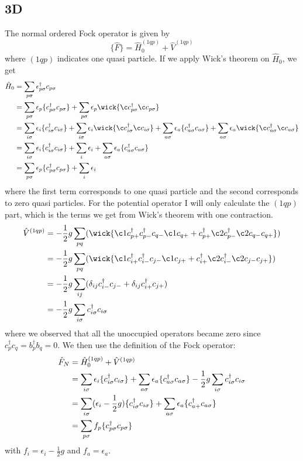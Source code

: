 \documentclass[norsk,a4paper,12pt]{article}
\begin{document}
\subsection*{3D}
The normal ordered Fock operator is given by 
\begin{equation}
\{\hat{F}\}=\hat{H}_0^{(1qp)}+\hat{V}^{(1qp)}
\end{equation}
where $(1qp)$ indicates one quasi particle. If we apply Wick's theorem on $\hat{H}_0$, we get
\begin{align}
\hat{H}_0&=\sum_{p\sigma}\epsilon_{p\sigma}^{\dagger}c_{p\sigma}\notag\\
&=\sum_{p\sigma}\epsilon_{p}\{c_{p\sigma}^{\dagger}c_{p\sigma}\}+\sum_{p\sigma}\epsilon_p\wick{\c c_{p\sigma}^{\dagger}\c c_{p\sigma}}\notag\\
&=\sum_{i\sigma}\epsilon_{i}\{c_{i\sigma}^{\dagger}c_{i\sigma}\}+\sum_{i\sigma}\epsilon_i\wick{\c c_{i\sigma}^{\dagger}\c c_{i\sigma}}+\sum_{a\sigma}\epsilon_{a}\{c_{a\sigma}^{\dagger}c_{a\sigma}\}+\sum_{a\sigma}\epsilon_a\wick{\c c_{a\sigma}^{\dagger}\c c_{a\sigma}}\notag\\
&=\sum_{i\sigma}\epsilon_{i}\{c_{i\sigma}^{\dagger}c_{i\sigma}\}+\sum_i\epsilon_i+\sum_{a\sigma}\epsilon_{a}\{c_{a\sigma}^{\dagger}c_{a\sigma}\}\notag\\
&=\sum_{p\sigma}\epsilon_{p}\{c_{p\sigma}^{\dagger}c_{p\sigma}\}+\sum_i\epsilon_i
\end{align} 
where the first term corresponds to one quasi particle and the second corresponds to zero quasi particles. For the potential operator I will only calculate the $(1qp)$ part, which is the terms we get from Wick's theorem with one contraction. 
\begin{align}
\hat{V}^{(1qp)}&=-\frac{1}{2}g\sum_{pq}(\wick{\c1 c_{p+}^{\dagger}c_{p-}^{\dagger}c_{q-}\c1 c_{q+}+c_{p+}^{\dagger}\c2 c_{p-}^{\dagger}\c2 c_{q-}c_{q+}})\notag\\
&=-\frac{1}{2}g\sum_{pq}(\wick{\c1 c_{i+}^{\dagger}c_{i-}^{\dagger}c_{j-}\c1 c_{j+}+c_{i+}^{\dagger}\c2 c_{i-}^{\dagger}\c2 c_{j-}c_{j+}})\notag\\
&=-\frac{1}{2}g\sum_{ij}(\delta_{ij}c_{i-}^{\dagger}c_{j-}+\delta_{ij}c_{i+}^{\dagger}c_{j+})\notag\\
&=-\frac{1}{2}g\sum_{i\sigma}c_{i\sigma}^{\dagger}c_{i\sigma}
\end{align}
where we observed that all the unoccupied operators became zero since $c_{p}^{\dagger}c_{q}=b_{p}^{\dagger}b_{q}=0$. We then use the definition of the Fock operator:
\begin{align}
\hat{F}_N&=\hat{H}_0^{(1qp)}+\hat{V}^{(1qp)}\notag\\
&=\sum_{i\sigma}\epsilon_{i}\{c_{i\sigma}^{\dagger}c_{i\sigma}\}+\sum_{a\sigma}\epsilon_{a}\{c_{a\sigma}^{\dagger}c_{a\sigma}\}-\frac{1}{2}g\sum_{i\sigma}c_{i\sigma}^{\dagger}c_{i\sigma}\notag\\
&=\sum_{i\sigma}(\epsilon_i-\frac{1}{2}g)\{c_{i\sigma}^{\dagger}c_{i\sigma}\}+\sum_{a\sigma}\epsilon_a\{c_{a+}^{\dagger}c_{a\sigma}\}\notag\\
&=\sum_{p\sigma}f_p\{c_{p\sigma}^{\dagger}c_{p\sigma}\}
\end{align}
with $f_i=\epsilon_i-\frac{1}{2}g$ and $f_a=\epsilon_a$.
\end{document}
